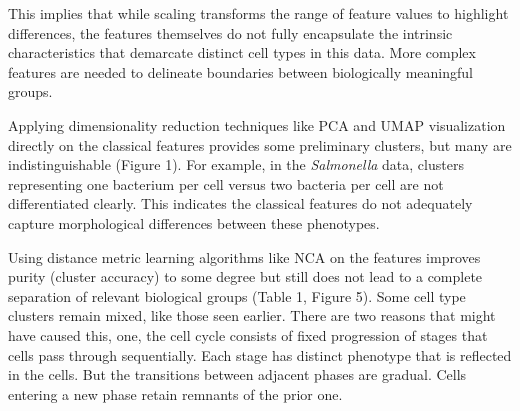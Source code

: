\documentclass[12pt,a4paper]{article}
\begin{document}
This implies that while scaling transforms the range of feature values to highlight differences, the features themselves do not fully encapsulate the intrinsic characteristics that demarcate distinct cell types in this data. More complex features are needed to delineate boundaries between biologically meaningful groups.

Applying dimensionality reduction techniques like PCA and UMAP visualization directly on the classical features provides some preliminary clusters, but many are indistinguishable (Figure 1). For example, in the \textit{Salmonella} data, clusters representing one bacterium per cell versus two bacteria per cell are not differentiated clearly. This indicates the classical features do not adequately capture morphological differences between these phenotypes.

Using distance metric learning algorithms like NCA on the features improves purity (cluster accuracy) to some degree but still does not lead to a complete separation of relevant biological groups (Table 1, Figure 5). Some cell type clusters remain mixed, like those seen earlier. There are two reasons that might have caused this, one, the cell cycle consists of fixed progression of stages that cells pass through sequentially. Each stage has distinct phenotype that is reflected in the cells. But the transitions between adjacent phases are gradual. Cells entering a new phase retain remnants of the prior one.
\end{document}
